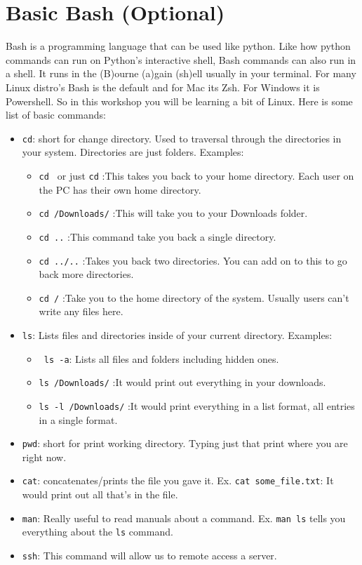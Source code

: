 \documentclass[12pt, a4paper]{article}
\begin{document}
\section{Basic Bash (Optional)}
Bash is a programming language that can be used like python. Like how python commands can run on Python's interactive shell, Bash commands can also run in a shell. It runs in the (B)ourne (a)gain (sh)ell usually in your terminal. For many Linux distro's Bash is the default and for Mac its Zsh. For Windows it is Powershell. So in this workshop you will be learning a bit of Linux. Here is some list of basic commands:


\begin{itemize}
    \item \verb`cd`: short for change directory. Used to traversal through the directories in your system. Directories are just folders. Examples:
        \begin{itemize}
		\item \texttt{cd \tilda} or just \verb`cd` :This takes you back to your home directory. Each user on the PC has their own home directory.
		\item \texttt{cd \tilda/Downloads/} :This will take you to your Downloads folder.
            \item \verb`cd ..` :This command take you back a single directory.
            \item \verb`cd ../..` :Takes you back two directories. You can add on to this to go back more directories.
            \item \verb`cd /`  :Take you to the home directory of the system. Usually users can't write any files here.
        \end{itemize}
    \item \verb`ls`: Lists files and directories inside of your current directory. Examples:
        \begin{itemize}
            \item \verb` ls -a`: Lists all files and folders including hidden ones.
    	    \item \texttt{ls \tilda/Downloads/} :It would print out everything in your downloads.
	    \item \texttt{ls -l \tilda/Downloads/} :It would print everything in a list format, all entries in a single format.
        \end{itemize}
    \item \verb`pwd`: short for print working directory. Typing just that print where you are right now.
    \item \verb`cat`: concatenates/prints the file you gave it. Ex. \verb`cat some_file.txt`: It would print out all that's in the file.
    \item \verb`man`: Really useful to read manuals about a command. Ex. \texttt{man ls} tells you everything about the \texttt{ls} command.
    \item \verb`ssh`: This command will allow us to remote access a server.
\end{itemize}
\end{document}
